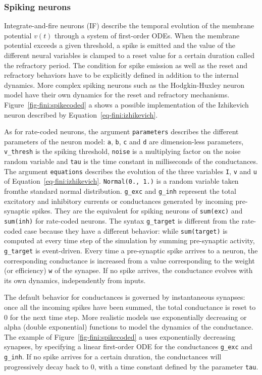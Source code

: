 \documentclass[
  11pt,
  a4paper,
]{scrbook}
\begin{document}
\subsubsection*{Spiking neurons}\label{spiking-neurons}

Integrate-and-fire neurons (IF) describe the temporal evolution of the
membrane potential \(v(t)\) through a system of first-order ODEs. When
the membrane potential exceeds a given threshold, a spike is emitted and
the value of the different neural variables is clamped to a reset value
for a certain duration called the refractory period. The condition for
spike emission as well as the reset and refractory behaviors have to be
explicitly defined in addition to the internal dynamics. More complex
spiking neurons such as the Hodgkin-Huxley neuron model have their own
dynamics for the reset and refractory mechanisms.
Figure~\ref{fig-fini:spikecoded} a shows a possible implementation of
the Izhikevich neuron described by Equation~\ref{eq-fini:izhikevich}.

As for rate-coded neurons, the argument \texttt{parameters} describes
the different parameters of the neuron model: \texttt{a}, \texttt{b},
\texttt{c} and \texttt{d} are dimension-less parameters,
\texttt{v\_thresh} is the spiking threshold, \texttt{noise} is a
multiplying factor on the noise random variable and \texttt{tau} is the
time constant in milliseconds of the conductances. The argument
\texttt{equations} describes the evolution of the three variables
\texttt{I}, \texttt{v} and \texttt{u} of
Equation~\ref{eq-fini:izhikevich}. \texttt{Normal(0.,\ 1.)} is a random
variable taken fromthe standard normal distribution. \texttt{g\_exc} and
\texttt{g\_inh} represent the total excitatory and inhibitory currents
or conductances generated by incoming pre-synaptic spikes. They are the
equivalent for spiking neurons of \texttt{sum(exc)} and
\texttt{sum(inh)} for rate-coded neurons. The syntax \texttt{g\_target}
is different from the rate-coded case because they have a different
behavior: while \texttt{sum(target)} is computed at every time step of
the simulation by summing pre-synaptic activity, \texttt{g\_target} is
event-driven. Every time a pre-synaptic spike arrives to a neuron, the
corresponding conductance is increased from a value corresponding to the
weight (or efficiency) \texttt{w} of the synapse. If no spike arrives,
the conductance evolves with its own dynamics, independently from
inputs.

The default behavior for conductances is governed by instantaneous
synapses: once all the incoming spikes have been summed, the total
conductance is reset to 0 for the next time step. More realistic models
use exponentially decreasing or alpha (double exponential) functions to
model the dynamics of the conductance. The example of
Figure~\ref{fig-fini:spikecoded} a uses exponentially decreasing
synapses, by specifying a linear first-order ODE for the conductances
\texttt{g\_exc} and \texttt{g\_inh}. If no spike arrives for a certain
duration, the conductances will progressively decay back to 0, with a
time constant defined by the parameter \texttt{tau}.
\end{document}
